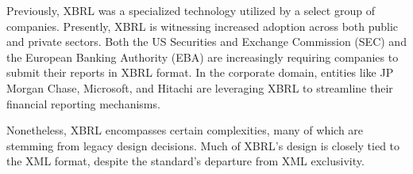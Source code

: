 Previously, XBRL was a specialized technology utilized by a select group of companies.
Presently, XBRL is witnessing increased adoption across both public and private sectors.
Both the US Securities and Exchange Commission (SEC)\cite{sec_ixbrl} and the European Banking Authority (EBA)\cite{eba_reporting_frameworks} are increasingly requiring companies to submit their reports in XBRL format.
In the corporate domain, entities like JP Morgan Chase, Microsoft, and Hitachi are leveraging XBRL to streamline their financial reporting mechanisms.\cite{pwc2002thejournal}

Nonetheless, XBRL encompasses certain complexities,
many of which are stemming from legacy design decisions.
Much of XBRL's design is closely tied to the XML format,
despite the standard's departure from XML exclusivity.

